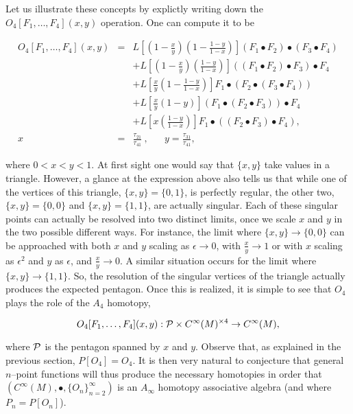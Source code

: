 \documentclass[a4paper,11pt]{article}
\begin{document}
Let us illustrate these concepts by explictly writing down the 
$O_{4}[F_{1}, \ldots, F_{4}](x,y)$ operation. One can compute it to be

\begin{eqnarray*}
O_{4}[F_{1}, \ldots, F_{4}](x,y) &=& L \left[ \left( 1 - \frac{x}{y} 
\right) \left( 1 - \frac{1-y}{1-x} \right) \right] ( F_{1} \bullet F_{2} ) 
\bullet ( F_{3} \bullet F_{4} )\\
&&+ L \left[ \left( 1 - \frac{x}{y} \right) \left( \frac{1-y}{1-x} \right) 
\right] ( ( F_{1} \bullet F_{2} ) \bullet F_{3} ) \bullet F_{4}\\
&&+ L \left[ \frac{x}{y} \left( 1 - \frac{1-y}{1-x} \right) \right] F_{1} 
\bullet ( F_{2} \bullet ( F_{3} \bullet F_{4} ) )\\
&&+ L \left[ \frac{x}{y} \left( 1 - y \right) \right] ( F_{1} \bullet ( 
F_{2} \bullet F_{3} ) ) \bullet F_{4}\\
&&+ L \left[ x \left( \frac{1-y}{1-x} \right) \right] F_{1} \bullet ( ( 
F_{2} \bullet F_{3} ) \bullet F_{4} ), \\
x &=& \frac{\tau_{21}}{\tau_{41}}\ , \;\;\;\;\;\; y = 
\frac{\tau_{31}}{\tau_{41}},
\end{eqnarray*}

\noindent
where $0 < x < y <1$. At first sight one would say that $\{x,y\}$ take 
values in a triangle. However, a glance at the expression above also 
tells us that while one of the vertices of this triangle, 
$\{x,y\}=\{0,1\}$, is perfectly regular, the other two, 
$\{x,y\}=\{0,0\}$ and $\{x,y\}=\{1,1\}$, are actually singular. Each 
of these singular points can actually be resolved into two distinct 
limits, once we scale $x$ and $y$ in the two possible different ways. 
For instance, the limit where $\{x,y\} \to \{0,0\}$ can be approached 
with both $x$ and $y$ scaling as $\epsilon \to 0$, with $\frac{x}{y} 
\to 1$ or with $x$ scaling as $\epsilon^{2}$ and $y$ as $\epsilon$, 
and $\frac{x}{y} \to 0$. A similar situation occurs for the limit 
where $\{x,y\} \to \{1,1\}$. So, the resolution of the singular vertices 
of the triangle actually produces the expected pentagon. Once this is 
realized, it is simple to see that $O_{4}$ plays the role of the $A_{4}$ 
homotopy,

$$
O_{4}[F_{1}, \ldots, F_{4}](x,y) : {\cal P} \times 
C^{\infty}(M)^{\times 4} \to C^{\infty}(M),
$$

\noindent
where ${\cal P}$ is the pentagon spanned by $x$ and $y$. Observe that, 
as explained in the previous section, $P[O_{4}]=O_{4}$. It is then very 
natural to conjecture that general $n$--point functions will thus 
produce the necessary homotopies in order that $\left( 
C^{\infty}(M), \bullet, \{ O_{n} \}_{n=2}^{\infty} \right)$ is an 
$A_{\infty}$ homotopy associative algebra (and where $P_{n} = 
P[O_{n}]$).
\end{document}
